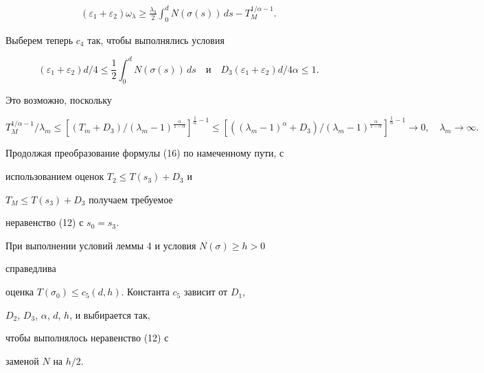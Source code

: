 \begin{pf}
\begin{multline}
(\varepsilon_1+\varepsilon_2)\omega_\lambda\ge\frac{\lambda_3}{2} 


\int^d_0 N(\sigma(s))\,ds-T^{1/\alpha-1}_M. 


\end{multline} 


Выберем теперь $c_4$ так, чтобы выполнялись условия 


$$ 


(\varepsilon_1+\varepsilon_2)d/4\le\frac{1}{2}\int^d_0 


N(\sigma(s))\,ds\quad 


\text{и} 


\quad D_3(\varepsilon_1+\varepsilon_2)d/4\alpha\le 1. 


$$ 


Это возможно, поскольку


$$ 


T^{1/\alpha-1}_M/\lambda_m\le\left[(T_m+D_3)/ 


(\lambda_m-1)^{\frac{\alpha}{1-\alpha}}\right]^{\frac{1}{\alpha}-1}\le 


\left[((\lambda_m-1)^\alpha+D_3)/ 


(\lambda_m-1)^{\frac{\alpha}{1-\alpha}}\right]^{\frac{1}{\alpha}-1} 


\to 0,\quad \lambda_m\to\infty. 


$$ 


Продолжая преобразование формулы (16) по намеченному пути, с 


использованием оценок $T_2\le T(s_3)+D_3$ и 


$T_M\le T(s_3)+D_3$ получаем требуемое 


неравенство (12) с $s_0=s_3$. 


\end{pf} 


 


\begin{cornonum} 


При выполнении условий леммы 4 и условия $N(\sigma)\ge h>0$


справедлива 


оценка $T(\sigma_0)\le c_5(d,h)$. Константа $c_5$ зависит от $D_1$, 


$D_2$, $D_3$, $\alpha$, $d$, $h$, и выбирается так,


чтобы выполнялось неравенство (12) с 


заменой $N$ на $h/2$. 


\end{cornonum} 



